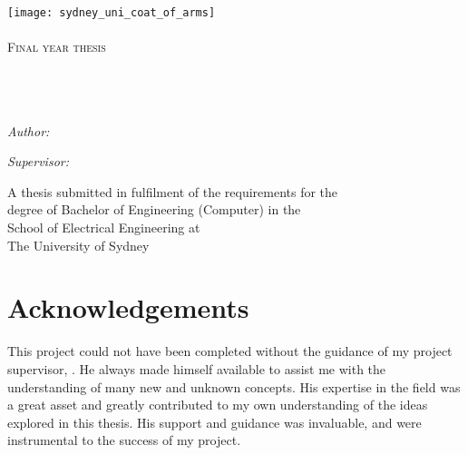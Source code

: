 \documentclass[a4paper]{report}
\title{\thesisTitle*{}}
\author{\studentName*{}}
\date{\thesisDate*{}}
\begin{document}
\begin{titlepage}
\centering

\texttt{[image: sydney\_uni\_coat\_of\_arms]}\\[1cm]
\textsc{\LARGE \universityName*{}}\\[1.5cm]
\textsc{\Large Final year thesis}\\[0.5cm]

\HRule \\[0.4cm]
{\huge \bfseries \thesisTitle*{}}\\[0.4cm]
\HRule \\[1.5cm]

\begin{minipage}{0.4\textwidth}
    \begin{flushleft}
    	\large
        \emph{Author:}\\
        \studentName*{}
    \end{flushleft}
\end{minipage}
\begin{minipage}{0.4\textwidth}
    \begin{flushright} 
    	\large
        \emph{Supervisor:} \\
        \supervisorName*{}
    \end{flushright}
\end{minipage}

\vfill

{\large A thesis submitted in fulfilment of the requirements for the\\
degree of Bachelor of Engineering (Computer) in the\\
School of Electrical Engineering at\\
The University of Sydney}

\vfill

{\large \thesisDate*{}}

\end{titlepage}


\chapter*{Acknowledgements}
This project could not have been completed without the guidance of my project 
supervisor, \supervisorName{}. He always made himself available to assist me 
with the understanding of many new and unknown concepts. His expertise in the 
field was a great asset and greatly contributed to my own understanding of the 
ideas explored in this thesis. His support and guidance was invaluable, and were
instrumental to the success of my project. 
\end{document}
